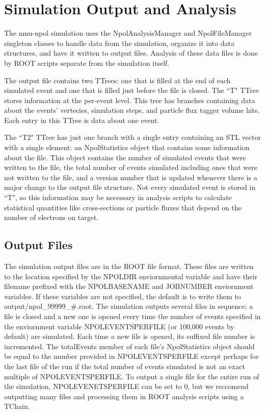 \documentclass[10pt,titlepage]{article}
\begin{document}
\section{Simulation Output and Analysis}

The nmu-npol simulation uses the NpolAnalysisManager and NpolFileManager singleton classes to handle data from the simulation, organize it into data structures, and have it written to output files.  Analysis of these data files is done by ROOT scripts separate from the simulation itself.

The output file contains two TTrees: one that is filled at the end of each simulated event and one that is filled just before the file is closed.  The ``T" TTree stores information at the per-event level.  This tree has branches containing data about the events' vertecies, simulation steps, and particle flux tagger volume hits.  Each entry in this TTree is data about one event.

The ``T2" TTree has just one branch with a single entry containing an STL vector with a single element: an NpolStatistics object that contains some information about the file.   This object contains the number of simulated events that were written to the file, the total number of events simulated including ones that were not written to the file, and a version number that is updated whenever there is a major change to the output file structure.  Not every simulated event is stored in ``T", so this information may be necessary in analysis scripts to calculate statistical quantities like cross-sections or particle fluxes that depend on the number of electrons on target.

\subsection{Output Files}

The simulation output files are in the ROOT file format.  These files are written to the location specified by the NPOLDIR enviornmental variable and have their filename prefixed with the NPOLBASENAME and JOBNUMBER enviornment variables.  If these variables are not specified, the default is to write them to output/npol\_99999\_\#.root.  The simulation outputs several files in sequence; a file is closed and a new one is opened every time the number of events specified in the enviornment variable NPOLEVENTSPERFILE (or 100,000 events by default) are simulated.  Each time a new file is opened, its suffixed file number is incremented.  The totalEvents member of each file's NpolStatistics object should be equal to the number provided in NPOLEVENTSPERFILE except perhaps for the last file of the run if the total number of events simulated is not an exact multiple of NPOLEVENTSPERFILE.  To output a single file for the entire run of the simulation, NPOLEVENETSPERFILE can be set to 0, but we reccomend outputting many files and processing them in ROOT analysis scripts using a TChain.
\end{document}
